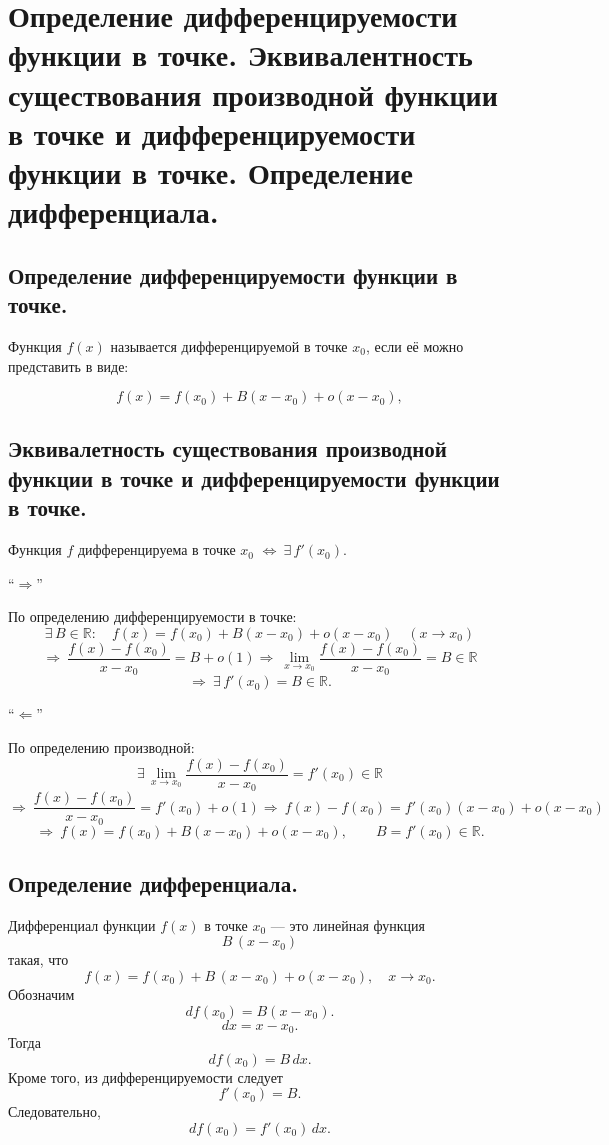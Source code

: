 \section{Определение дифференцируемости функции в точке. Эквивалентность существования производной функции в точке и дифференцируемости функции в точке. Определение дифференциала.}

\subsection{Определение дифференцируемости функции в точке.}
\begin{definition}
Функция $f(x)$ называется дифференцируемой в точке $x_0$, если её можно представить в виде:

\[
f(x)=f(x_0)+B(x-x_0)+o(x-x_0),
\]
\end{definition}

\subsection{Эквивалетность существования производной функции в точке и дифференцируемости функции в точке.}
\begin{theorem}
Функция $f$ дифференцируема в точке $x_0$
\(\Longleftrightarrow\ \exists\, f'(x_0)\).
\end{theorem}

\begin{Proof}
``$\Longrightarrow$''

По определению дифференцируемости в точке:
\[
\exists\,B\in\mathbb{R}:\quad
f(x)=f(x_0)+B(x-x_0)+o(x-x_0)\quad (x\to x_0)
\]
\[
\Longrightarrow\ \frac{f(x)-f(x_0)}{x-x_0}=B+o(1)
\Longrightarrow\ \lim_{x\to x_0}\frac{f(x)-f(x_0)}{x-x_0}=B\in\mathbb{R}
\]
\[
\Longrightarrow\ \exists\,f'(x_0)=B\in\mathbb{R}.
\]

``$\Longleftarrow$''

По определению производной:
\[
\exists\,\lim_{x\to x_0}\frac{f(x)-f(x_0)}{x-x_0}=f'(x_0)\in\mathbb{R}
\]
\[
\Longrightarrow\ \frac{f(x)-f(x_0)}{x-x_0}=f'(x_0)+o(1)
\Longrightarrow\ f(x)-f(x_0)=f'(x_0)(x-x_0)+o(x-x_0)
\]
\[
\Longrightarrow\ f(x)=f(x_0)+B(x-x_0)+o(x-x_0),\qquad B=f'(x_0)\in\mathbb{R}.
\]
\end{Proof}

\subsection{Определение дифференциала.}
\begin{definition}
Дифференциал функции $f(x)$ в точке $x_0$ — это линейная функция
\[
B\,(x-x_0)
\]
такая, что
\[
f(x)=f(x_0)+B\,(x-x_0)+o(x-x_0),\quad x\to x_0.
\]
Обозначим \[
df(x_0)=B(x-x_0).
\]
\[
dx=x-x_0.
\]
Тогда
\[
df(x_0)=B\,dx.
\]
Кроме того, из дифференцируемости следует
\[
f'(x_0)=B.
\]
Следовательно,
\[
df(x_0)=f'(x_0)\,dx.
\]
\end{definition}


